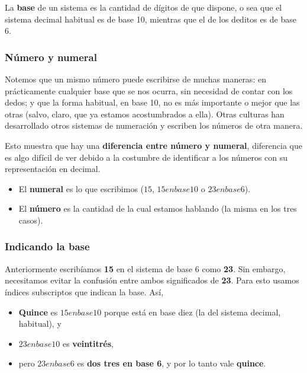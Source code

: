 \documentclass[spanish,A4,]{article}
\begin{document}
La \textbf{base} de un sistema es la cantidad de dígitos de que dispone,
o sea que el sistema decimal habitual es de base 10, mientras que el de
los deditos es de base 6.

\subsubsection{Número y numeral}\label{nuxfamero-y-numeral}

Notemos que un mismo número puede escribirse de muchas maneras: en
prácticamente cualquier base que se nos ocurra, sin necesidad de contar
con los dedos; y que la forma habitual, en base 10, no es más importante
o mejor que las otras (salvo, claro, que ya estamos acostumbrados a
ella). Otras culturas han desarrollado otros sistemas de numeración y
escriben los números de otra manera.

Esto muestra que hay una \textbf{diferencia entre número y numeral},
diferencia que es algo difícil de ver debido a la costumbre de
identificar a los números con su representación en decimal.

\begin{itemize}
\itemsep1pt\parskip0pt
\item
  El \textbf{numeral} es lo que escribimos ($15$, \textbf{$15 en base 10$} o
  \textbf{$23 en base 6$}).
\item
  El \textbf{número} es la cantidad de la cual estamos hablando (la
  misma en los tres casos).
\end{itemize}

\subsubsection{Indicando la base}\label{indicando-la-base}

Anteriormente escribíamos \textbf{15} en el sistema de base 6 como
\textbf{23}. Sin embargo, necesitamos evitar la confusión entre ambos
significados de \textbf{23}. Para esto usamos índices subscriptos que
indican la base. Así,

\begin{itemize}
\itemsep1pt\parskip0pt
\item
  \textbf{Quince} es \textbf{$15 en base 10$} porque está en base diez (la
  del sistema decimal, habitual), y
\item
  \textbf{$23 en base 10$} es \textbf{veintitrés},
\item
  pero \textbf{$23 en base 6$} es \textbf{dos tres en base 6}, y por lo tanto
  vale \textbf{quince}.
\end{itemize}
\end{document}
